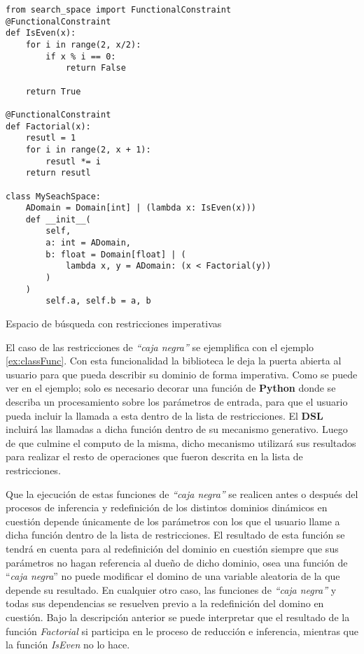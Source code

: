 \begin{listing}[!ht]
    \begin{verbatim}
from search_space import FunctionalConstraint
@FunctionalConstraint
def IsEven(x):
    for i in range(2, x/2):
        if x % i == 0:
            return False
        
    return True

@FunctionalConstraint
def Factorial(x):
    resutl = 1
    for i in range(2, x + 1):
        resutl *= i
    return resutl

class MySeachSpace:
    ADomain = Domain[int] | (lambda x: IsEven(x)))
    def __init__(
        self, 
        a: int = ADomain,
        b: float = Domain[float] | (
            lambda x, y = ADomain: (x < Factorial(y))
        )
    )
        self.a, self.b = a, b

    \end{verbatim}
    \caption{Espacio de búsqueda con restricciones imperativas}
    \label{ex:classFunc}
\end{listing}


El caso de las restricciones de {\it “caja negra”} se ejemplifica con el ejemplo \ref{ex:classFunc}. Con esta funcionalidad
la biblioteca le deja la puerta abierta al usuario para que pueda describir su dominio de forma imperativa.
Como se puede ver en el ejemplo; solo es necesario decorar una función de {\bf Python} donde se describa un
procesamiento sobre los parámetros de entrada, para que el usuario pueda incluir la llamada a esta dentro de
la lista de restricciones. El {\bf DSL} incluirá las llamadas a dicha función dentro de su mecanismo generativo.
Luego de que culmine el computo de la misma, dicho mecanismo utilizará sus resultados para realizar el resto
de operaciones que fueron descrita en la lista de restricciones.

Que la ejecución de estas funciones de {\it “caja negra”} se realicen antes o después del procesos de
inferencia y redefinición de los distintos dominios dinámicos en cuestión depende únicamente de los
parámetros con los que el usuario llame a dicha función dentro de la lista de restricciones. El resultado
de esta función se tendrá en cuenta para al redefinición del dominio en cuestión siempre que sus parámetros
no hagan referencia al dueño de dicho dominio, osea una función de ``{\it caja negra}'' no puede modificar
el domino de una variable aleatoria de la que depende su resultado. En cualquier otro caso, las funciones de
    {\it “caja negra”} y todas sus dependencias se resuelven previo a la redefinición del domino en cuestión. Bajo
la descripción anterior se puede interpretar que el resultado de la función {\it Factorial} si participa en le
proceso de reducción e inferencia, mientras que la función {\it IsEven} no lo hace.

